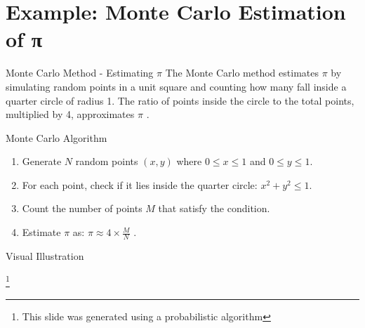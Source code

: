 \section[Example: Monte Carlo Estimation of pi]{Example: Monte Carlo Estimation of π}
\begin{frame}{Monte Carlo Method - Estimating $\pi$}
  The Monte Carlo method \parencite{Metropolis01091949} estimates $\pi$ by simulating random points in a unit square and counting how many fall inside a quarter circle of radius 1. The ratio of points inside the circle to the total points, multiplied by 4, approximates $\pi$ \parencite{beckmann1971history}.
\end{frame}



\begin{frame}{Monte Carlo Algorithm}
  \begin{enumerate}
    \item Generate $N$ random points $(x, y)$ where $0 \leq x \leq 1$ and $0 \leq y \leq 1$.
    \item For each point, check if it lies inside the quarter circle: $x^2 + y^2 \leq 1$.
    \item Count the number of points $M$ that satisfy the condition.
    \item Estimate $\pi$ as: $\pi \approx 4 \times \frac{M}{N}$ \parencite{hammersley1964monte}.
  \end{enumerate}
\end{frame}

\begin{frame}{Visual Illustration}
  \begin{center}
  \end{center}
  \footnote{This slide was generated using a probabilistic algorithm}
\end{frame}


